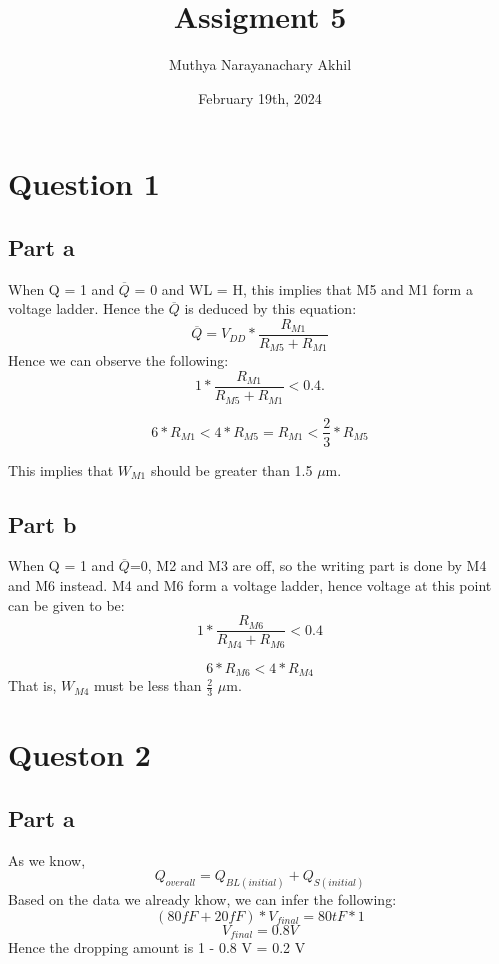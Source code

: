 \documentclass{article}
\title{Assigment 5}
\author{Muthya Narayanachary Akhil}
\date{February 19th, 2024}
\begin{document}
\maketitle

\section*{Question 1}

\subsection*{Part a}

When Q = 1 and $\overline{Q}$ = 0 and WL = H, this implies that M5 and M1 form a voltage ladder.
Hence the $\overline{Q}$ is deduced by this equation:
\begin{equation}
    \overline{Q} = V_{DD} * \frac{R_{M1}}{R_{M5} + R_{M1}}
\end{equation}
Hence we can observe the following:
\begin{equation}
    1 * \frac{R_{M1}}{R_{M5} + R_{M1}} < 0.4.
\end{equation}

\begin{equation}
    6 * R_{M1} < 4 * R_{M5} = R_{M1} < \frac{2}{3} * R_{M5}
\end{equation}

This implies that $W_{M1}$ should be greater than 1.5 $\mu$m.

\subsection*{Part b}

When Q = 1 and $\overline{Q}$=0, M2 and M3 are off, so the writing part is done by M4 and M6 instead.
M4 and M6 form a voltage ladder, hence voltage at this point can be given to be:
\begin{equation}
    1 * \frac{R_{M6}}{R_{M4} + R_{M6}} < 0.4
\end{equation}

\begin{equation}
    6 * R_{M6} < 4 * R_{M4}
\end{equation}
That is, $W_{M4}$ must be less than $\frac{2}{3}$ $\mu$m.


\section*{Queston 2}
\subsection*{Part a}
As we know,
\begin{equation}
    Q_{overall} = Q_{BL(initial)} + Q_{S(initial)}
\end{equation}
Based on the data we already khow, we can infer the following:
\begin{equation}
    (80fF + 20fF) * V_{final} = 80tF*1
\end{equation}
\begin{equation}
    V_{final} = 0.8V
\end{equation}
Hence the dropping amount is 1 - 0.8 V = 0.2 V
\end{document}
